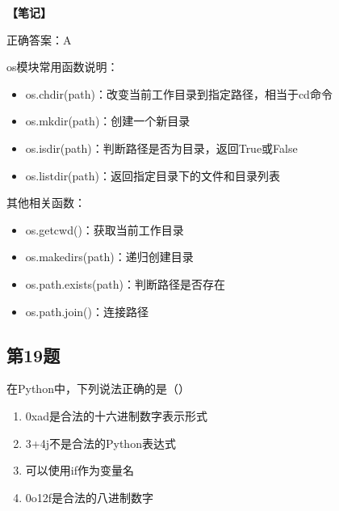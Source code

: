 \begin{mdframed}[linewidth=1pt, linecolor=black]

  \textbf{\color{red}【笔记】}

  正确答案：A

  os模块常用函数说明：
  \begin{itemize}
    \item os.chdir(path)：改变当前工作目录到指定路径，相当于cd命令
    \item os.mkdir(path)：创建一个新目录
    \item os.isdir(path)：判断路径是否为目录，返回True或False
    \item os.listdir(path)：返回指定目录下的文件和目录列表
  \end{itemize}

  其他相关函数：
  \begin{itemize}
    \item os.getcwd()：获取当前工作目录
    \item os.makedirs(path)：递归创建目录
    \item os.path.exists(path)：判断路径是否存在
    \item os.path.join()：连接路径
  \end{itemize}

\end{mdframed}

\subsection{第19题}
在Python中，下列说法正确的是（）

\begin{enumerate}[label=\Alph*.]
  \item 0xad是合法的十六进制数字表示形式
  \item 3+4j不是合法的Python表达式
  \item 可以使用if作为变量名
  \item 0o12f是合法的八进制数字
\end{enumerate}

